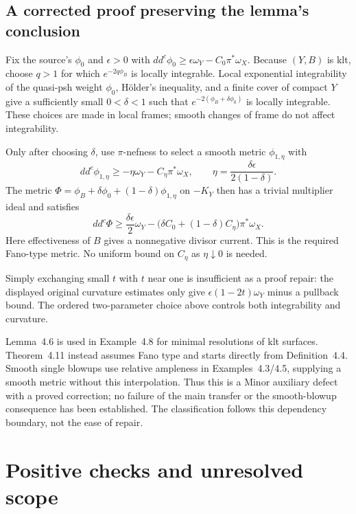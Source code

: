 \documentclass[10pt]{article}
\begin{document}
\subsection*{A corrected proof preserving the lemma’s conclusion}
Fix the source’s \(\phi_0\) and \(\epsilon>0\) with \(dd^c\phi_0\ge\epsilon\omega_Y-C_0\pi^*\omega_X\). Because \((Y,B)\) is klt, choose \(q>1\) for which \(e^{-2q\phi_B}\) is locally integrable. Local exponential integrability of the quasi-psh weight \(\phi_0\), Hölder’s inequality, and a finite cover of compact \(Y\) give a sufficiently small \(0<\delta<1\) such that \(e^{-2(\phi_B+\delta\phi_0)}\) is locally integrable. These choices are made in local frames; smooth changes of frame do not affect integrability.\par
Only after choosing \(\delta\), use \(\pi\)-nefness to select a smooth metric \(\phi_{1,\eta}\) with \[dd^c\phi_{1,\eta}\ge-\eta\omega_Y-C_\eta\pi^*\omega_X,
 \qquad \eta=\frac{\delta\epsilon}{2(1-\delta)}.\] The metric \(\Phi=\phi_B+\delta\phi_0+(1-\delta)\phi_{1,\eta}\) on \(-K_Y\) then has a trivial multiplier ideal and satisfies \[dd^c\Phi\ge \frac{\delta\epsilon}{2}\omega_Y
 -\bigl(\delta C_0+(1-\delta)C_\eta\bigr)\pi^*\omega_X.\] Here effectiveness of \(B\) gives a nonnegative divisor current. This is the required Fano-type metric. No uniform bound on \(C_\eta\) as \(\eta\downarrow0\) is needed.\par
Simply exchanging small \(t\) with \(t\) near one is insufficient as a proof repair: the displayed original curvature estimates only give \(\epsilon(1-2t)\omega_Y\) minus a pullback bound. The ordered two-parameter choice above controls both integrability and curvature.\par
Lemma 4.6 is used in Example 4.8 for minimal resolutions of klt surfaces. Theorem 4.11 instead assumes Fano type and starts directly from Definition 4.4. Smooth single blowups use relative ampleness in Examples 4.3/4.5, supplying a smooth metric without this interpolation. Thus this is a Minor auxiliary defect with a proved correction; no failure of the main transfer or the smooth-blowup consequence has been established. The classification follows this dependency boundary, not the ease of repair.\par
\section*{Positive checks and unresolved scope}
\end{document}
